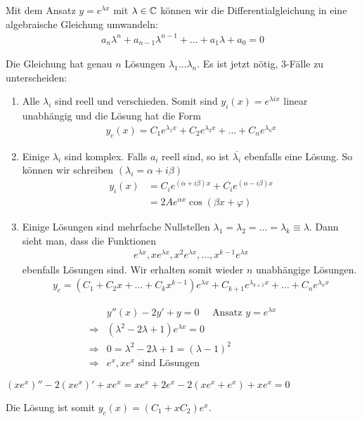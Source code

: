 Mit dem Ansatz $y = e^{\lambda x}$ mit $\lambda \in \mathbb{C}$ können wir die Differentialgleichung in eine algebraische Gleichung umwandeln:
\begin{align*}
 a_n\lambda^n + a_{n-1}\lambda^{n-1} + \ldots + a_1\lambda + a_0 = 0
\end{align*}

Die Gleichung hat genau $n$ Lösungen $\lambda_1 \ldots \lambda_n$. Es ist jetzt nötig, 3-Fälle zu unterscheiden:
\begin{enumerate}
  \item Alle $\lambda_i$ sind reell und verschieden. Somit sind $y_i(x) =
  e^{\lambda ix}$ linear unabhängig und die Lösung hat die Form
  \begin{align}
  y_c(x) = C_1e^{\lambda_1 x}+ C_2e^{\lambda_2 x}+\ldots+ C_ne^{\lambda_n x}
  \end{align}
  \item Einige $\lambda_i$ sind komplex. Falls $a_i$ reell sind, so ist
  $\overline{\lambda_i}$ ebenfalls eine Lösung. So können wir schreiben
  $(\lambda_i = \alpha+i\beta)$
  \begin{align}
  y_i(x) &= C_i e^{(\alpha + i\beta)x} + \overline{C_i} e^{(\alpha - i\beta)x}\\
  &= 2A e^{\alpha x}\cos{(\beta x + \varphi)}
  \end{align}
  \item Einige Lösungen sind mehrfache Nullstellen $\lambda_1 = \lambda_2 =
  \ldots = \lambda_k \equiv \lambda$. Dann sieht man, dass die Funktionen
  \begin{align*}
  e^{\lambda x}, xe^{\lambda x}, x^2e^{\lambda x}, \ldots, x^{k-1}e^{\lambda x}
  \end{align*}
  ebenfalls Lösungen sind. Wir erhalten somit wieder $n$ unabhängige Lösungen.
  \begin{align}
  y_c = (C_1+C_2x+\ldots+C_kx^{k-1})e^{\lambda x} +
  C_{k+1}e^{\lambda_{k+1}x}+\ldots+C_ne^{\lambda_nx}
 \end{align}
\end{enumerate}

\begin{Beispiel}
\begin{align*}
&y''(x) - 2y' +y = 0\quad \text{ Ansatz } y = e^{\lambda x} \\
\Rightarrow & (\lambda^2 -2\lambda +1)e^{\lambda x} = 0\\
\Rightarrow & 0 = \lambda^2 -2\lambda +1 = (\lambda -1)^2\\
\Rightarrow & e^x, xe^x \text{ sind Lösungen}
\end{align*}
\par
\begin{info}
$(xe^x)'' - 2(xe^x)' + xe^x = xe^x+2e^x-2(xe^x+e^x)+xe^x = 0$
\end{info}
\par
Die Lösung ist somit $y_c(x) = (C_1+xC_2)e^x$.
\end{Beispiel}

